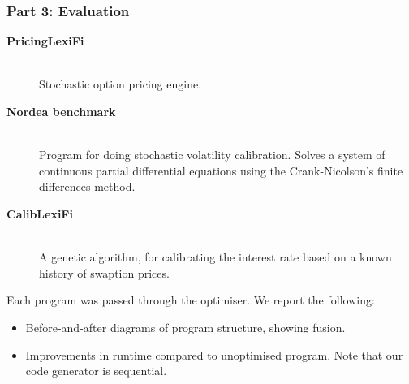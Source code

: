 \documentclass[rgb,dvipsnames]{beamer}
\begin{document}
\begin{frame}
  \frametitle{Part 3: Evaluation}

\begin{description}
\item[\bf PricingLexiFi]\hfill\\ Stochastic option pricing engine.

\item[\bf Nordea benchmark]\hfill\\ Program for doing stochastic volatility
  calibration.  Solves a system of continuous partial differential
  equations using the Crank-Nicolson's finite differences method.

\item[\bf CalibLexiFi]\hfill\\ A genetic algorithm, for calibrating the interest
  rate based on a known history of swaption prices.
\end{description}

Each program was passed through the optimiser.  We report the
following:

\begin{itemize}
\item Before-and-after diagrams of program structure, showing fusion.
\item Improvements in runtime compared to unoptimised program.  Note
  that our code generator is sequential.
\end{itemize}
\end{frame}
\end{document}
